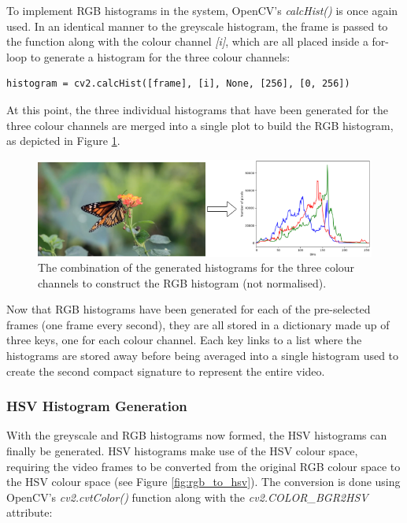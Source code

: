 To implement RGB histograms in the system, OpenCV's \textit{calcHist()} is once again used. In an identical manner to the greyscale histogram, the frame is passed to the function along with the colour channel \textit{[i]}, which are all placed inside a for-loop to generate a histogram for the three colour channels:

\begin{lstlisting}
histogram = cv2.calcHist([frame], [i], None, [256], [0, 256])
\end{lstlisting}

At this point, the three individual histograms that have been generated for the three colour channels are merged into a single plot to build the RGB histogram, as depicted in Figure \ref{fig:implementation-rgb_not_normalised}.

\begin{figure}[h] 
\centerline{\includegraphics[width=\textwidth]{figures/implementation/rgb_not_normalised.png}}
\caption{\label{fig:implementation-rgb_not_normalised}The combination of the generated histograms for the three colour channels to construct the RGB histogram (not normalised).}
\end{figure}

Now that RGB histograms have been generated for each of the pre-selected frames (one frame every second), they are all stored in a dictionary made up of three keys, one for each colour channel. Each key links to a list where the histograms are stored away before being averaged into a single histogram used to create the second compact signature to represent the entire video. 


\subsubsection{HSV Histogram Generation}

With the greyscale and RGB histograms now formed, the HSV histograms can finally be generated. HSV histograms make use of the HSV colour space, requiring the video frames to be converted from the original RGB colour space to the HSV colour space (see Figure \ref{fig:rgb_to_hsv}). The conversion is done using OpenCV's \textit{cv2.cvtColor()} function along with the \textit{cv2.COLOR\_BGR2HSV} attribute:


